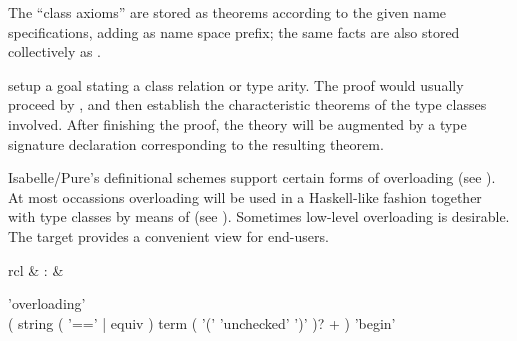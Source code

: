 \begin{isabellebody}
\begin{isamarkuptext}
\begin{descr}
  The ``class axioms'' are stored as theorems according to the given
  name specifications, adding  as name space prefix;
  the same facts are also stored collectively as .
  
  \item [\mbox{\isa{\isacommand{instance}}}~\isa{{\isachardoublequote}c\isactrlsub {\isadigit{1}}\ {\isasymsubseteq}\ c\isactrlsub {\isadigit{2}}{\isachardoublequote}} and
  \mbox{\isa{\isacommand{instance}}}~\isa{{\isachardoublequote}t\ {\isacharcolon}{\isacharcolon}\ {\isacharparenleft}s\isactrlsub {\isadigit{1}}{\isacharcomma}\ {\isasymdots}{\isacharcomma}\ s\isactrlsub n{\isacharparenright}\ s{\isachardoublequote}}]
  setup a goal stating a class relation or type arity.  The proof
  would usually proceed by \mbox{}, and then establish
  the characteristic theorems of the type classes involved.  After
  finishing the proof, the theory will be augmented by a type
  signature declaration corresponding to the resulting theorem.

  \end{descr}%
\end{isamarkuptext}%
\isamarkuptrue%
%
\isamarkuptrue%
%
\begin{isamarkuptext}%
Isabelle/Pure's definitional schemes support certain forms of
  overloading (see ).  At most occassions
  overloading will be used in a Haskell-like fashion together with
  type classes by means of \mbox{} (see
  ).  Sometimes low-level overloading is desirable.
  The \mbox{} target provides a convenient view for
  end-users.

  \begin{matharray}{rcl}
    \mbox{} & : &  \\
  \end{matharray}

  \begin{rail}
    'overloading' \\
    ( string ( '==' | equiv ) term ( '(' 'unchecked' ')' )? + ) 'begin'
  \end{rail}

  \begin{descr}


\end{descr}
\end{isamarkuptext}
\end{isabellebody}
